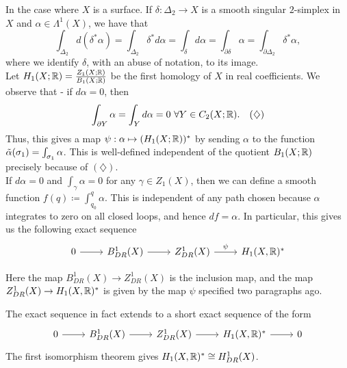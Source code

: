 \documentclass{article}
\begin{document}
{In the case where $X$ is a surface. If $\delta: \Delta_2 \to X$ is a smooth singular  $2$-simplex in $X$ and $\alpha \in \Lambda^1(X)$, we have that
\[\int_{\Delta_2} d(\delta^* \alpha) = \int_{\Delta_2} \delta^* d\alpha = \int_\delta d\alpha = \int_{\partial \delta} \alpha = \int_{\partial \Delta_2} \delta^* \alpha,\]
where we identify $\delta$, with an abuse of notation, to its image.\\

Let $H_1(X; \mathbb{R}) = \frac{Z_1(X; \mathbb{R})}{B_1(X; \mathbb{R})}$ be the first homology of $X$ in real coefficients. We observe that - if $d \alpha = 0$, then
\[\int_{\partial Y} \alpha = \int_Y d\alpha = 0\ \forall Y \in C_2(X; \mathbb{R}).\quad (\diamondsuit)\]
Thus, this gives a map $\psi: \alpha \mapsto (H_1(X; \mathbb{R}))^*$ by sending $\alpha$ to the function $\Tilde{\alpha}(\sigma_1) = \int_{\sigma_1} \alpha$. This is well-defined independent of the quotient $B_1(X; \mathbb{R})$ precisely because of $(\diamondsuit)$.\\

If $d\alpha = 0$ and $\int_{\gamma} \alpha = 0$ for any $\gamma \in Z_1(X)$, then we can define a smooth function $f(q) \coloneqq \int_{q_0}^q \alpha$. This is independent of any path chosen because $\alpha$ integrates to zero on all closed loops, and hence $df = \alpha$. In particular, this gives us the following exact sequence
\[\begin{tikzcd}
	0 & {B^1_{DR}(X)} & {Z^1_{DR}(X)} & {H_1(X, \Rbb)^*} 
	\arrow[from=1-1, to=1-2]
	\arrow[from=1-2, to=1-3]
	\arrow["{\psi}", from=1-3, to=1-4]
\end{tikzcd}\]

Here the map $B^1_{DR}(X) \to Z^1_{DR}(X)$ is the inclusion map, and the map $Z^1_{DR}(X) \to H_1(X, \mathbb{R})^*$ is given by the map $\psi$ specified two paragraphs ago.

\begin{exercise}
    The exact sequence in fact extends to a short exact sequence of the form
\[\begin{tikzcd}
	0 & {B^1_{DR}(X)} & {Z^1_{DR}(X)} & {H_1(X, \Rbb)^*} & 0
	\arrow[from=1-1, to=1-2]
	\arrow[from=1-2, to=1-3]
	\arrow[from=1-3, to=1-4]
	\arrow[from=1-4, to=1-5]
\end{tikzcd}\]
The first isomorphism theorem gives $H_1(X, \mathbb{R})^* \cong H^1_{DR}(X)$.
\end{exercise}

}
\end{document}
